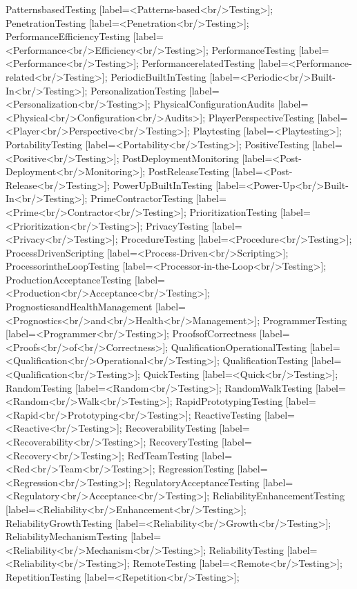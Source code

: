 \documentclass{article}
\begin{document}
{PatternsbasedTesting [label=<Patterns-based<br/>Testing>];
PenetrationTesting [label=<Penetration<br/>Testing>];
PerformanceEfficiencyTesting [label=<Performance<br/>Efficiency<br/>Testing>];
PerformanceTesting [label=<Performance<br/>Testing>];
PerformancerelatedTesting [label=<Performance-related<br/>Testing>];
PeriodicBuiltInTesting [label=<Periodic<br/>Built-In<br/>Testing>];
PersonalizationTesting [label=<Personalization<br/>Testing>];
PhysicalConfigurationAudits [label=<Physical<br/>Configuration<br/>Audits>];
PlayerPerspectiveTesting [label=<Player<br/>Perspective<br/>Testing>];
Playtesting [label=<Playtesting>];
PortabilityTesting [label=<Portability<br/>Testing>];
PositiveTesting [label=<Positive<br/>Testing>];
PostDeploymentMonitoring [label=<Post-Deployment<br/>Monitoring>];
PostReleaseTesting [label=<Post-Release<br/>Testing>];
PowerUpBuiltInTesting [label=<Power-Up<br/>Built-In<br/>Testing>];
PrimeContractorTesting [label=<Prime<br/>Contractor<br/>Testing>];
PrioritizationTesting [label=<Prioritization<br/>Testing>];
PrivacyTesting [label=<Privacy<br/>Testing>];
ProcedureTesting [label=<Procedure<br/>Testing>];
ProcessDrivenScripting [label=<Process-Driven<br/>Scripting>];
ProcessorintheLoopTesting [label=<Processor-in-the-Loop<br/>Testing>];
ProductionAcceptanceTesting [label=<Production<br/>Acceptance<br/>Testing>];
PrognosticsandHealthManagement [label=<Prognostics<br/>and<br/>Health<br/>Management>];
ProgrammerTesting [label=<Programmer<br/>Testing>];
ProofsofCorrectness [label=<Proofs<br/>of<br/>Correctness>];
QualificationOperationalTesting [label=<Qualification<br/>Operational<br/>Testing>];
QualificationTesting [label=<Qualification<br/>Testing>];
QuickTesting [label=<Quick<br/>Testing>];
RandomTesting [label=<Random<br/>Testing>];
RandomWalkTesting [label=<Random<br/>Walk<br/>Testing>];
RapidPrototypingTesting [label=<Rapid<br/>Prototyping<br/>Testing>];
ReactiveTesting [label=<Reactive<br/>Testing>];
RecoverabilityTesting [label=<Recoverability<br/>Testing>];
RecoveryTesting [label=<Recovery<br/>Testing>];
RedTeamTesting [label=<Red<br/>Team<br/>Testing>];
RegressionTesting [label=<Regression<br/>Testing>];
RegulatoryAcceptanceTesting [label=<Regulatory<br/>Acceptance<br/>Testing>];
ReliabilityEnhancementTesting [label=<Reliability<br/>Enhancement<br/>Testing>];
ReliabilityGrowthTesting [label=<Reliability<br/>Growth<br/>Testing>];
ReliabilityMechanismTesting [label=<Reliability<br/>Mechanism<br/>Testing>];
ReliabilityTesting [label=<Reliability<br/>Testing>];
RemoteTesting [label=<Remote<br/>Testing>];
RepetitionTesting [label=<Repetition<br/>Testing>];
}
\end{document}
